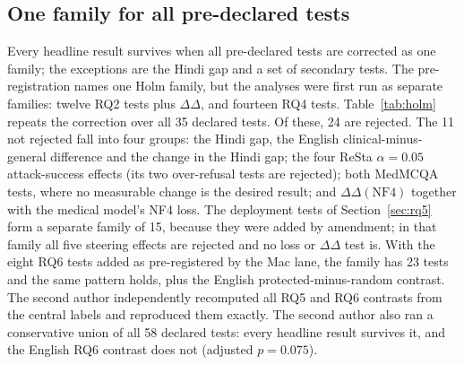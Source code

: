 \subsection{One family for all pre-declared tests}\label{sec:holm}
Every headline result survives when all pre-declared tests are corrected as one family; the exceptions are the Hindi gap and a set of secondary tests. The pre-registration names one Holm family, but the analyses were first run as separate families: twelve RQ2 tests plus $\Delta\Delta$, and fourteen RQ4 tests. Table~\ref{tab:holm} repeats the correction over all 35 declared tests. Of these, 24 are rejected. The 11 not rejected fall into four groups: the Hindi gap, the English clinical-minus-general difference and the change in the Hindi gap; the four ReSta $\alpha=0.05$ attack-success effects (its two over-refusal tests are rejected); both MedMCQA tests, where no measurable change is the desired result; and $\Delta\Delta(\mathrm{NF4})$ together with the medical model's NF4 loss. The deployment tests of Section~\ref{sec:rq5} form a separate family of 15, because they were added by amendment; in that family all five steering effects are rejected and no loss or $\Delta\Delta$ test is. With the eight RQ6 tests added as pre-registered by the Mac lane, the family has 23 tests and the same pattern holds, plus the English protected-minus-random contrast. The second author independently recomputed all RQ5 and RQ6 contrasts from the central labels and reproduced them exactly. The second author also ran a conservative union of all 58 declared tests: every headline result survives it, and the English RQ6 contrast does not (adjusted $p = 0.075$).

